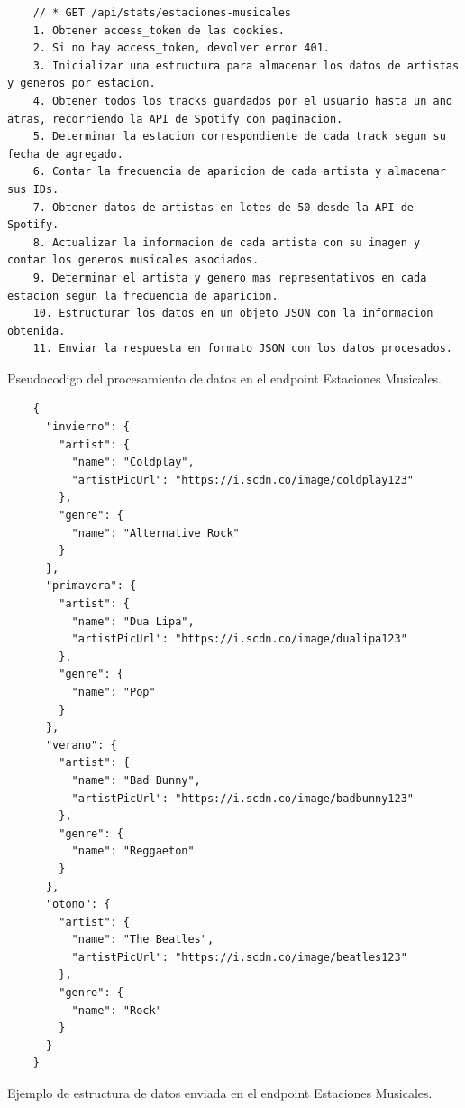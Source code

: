 \begin{ifalgorithm}[H]
  \begin{lstlisting}
    // * GET /api/stats/estaciones-musicales
    1. Obtener access_token de las cookies.
    2. Si no hay access_token, devolver error 401.
    3. Inicializar una estructura para almacenar los datos de artistas y generos por estacion.
    4. Obtener todos los tracks guardados por el usuario hasta un ano atras, recorriendo la API de Spotify con paginacion.
    5. Determinar la estacion correspondiente de cada track segun su fecha de agregado.
    6. Contar la frecuencia de aparicion de cada artista y almacenar sus IDs.
    7. Obtener datos de artistas en lotes de 50 desde la API de Spotify.
    8. Actualizar la informacion de cada artista con su imagen y contar los generos musicales asociados.
    9. Determinar el artista y genero mas representativos en cada estacion segun la frecuencia de aparicion.
    10. Estructurar los datos en un objeto JSON con la informacion obtenida.
    11. Enviar la respuesta en formato JSON con los datos procesados.
    \end{lstlisting}
  \caption{Pseudocodigo del procesamiento de datos en el endpoint Estaciones Musicales.}
  \label{alg:estaciones_musicales}
\end{ifalgorithm}

\begin{ifalgorithm}[H]
  \begin{lstlisting}
    {
      "invierno": {
        "artist": {
          "name": "Coldplay",
          "artistPicUrl": "https://i.scdn.co/image/coldplay123"
        },
        "genre": {
          "name": "Alternative Rock"
        }
      },
      "primavera": {
        "artist": {
          "name": "Dua Lipa",
          "artistPicUrl": "https://i.scdn.co/image/dualipa123"
        },
        "genre": {
          "name": "Pop"
        }
      },
      "verano": {
        "artist": {
          "name": "Bad Bunny",
          "artistPicUrl": "https://i.scdn.co/image/badbunny123"
        },
        "genre": {
          "name": "Reggaeton"
        }
      },
      "otono": {
        "artist": {
          "name": "The Beatles",
          "artistPicUrl": "https://i.scdn.co/image/beatles123"
        },
        "genre": {
          "name": "Rock"
        }
      }
    }
    \end{lstlisting}
  \caption{Ejemplo de estructura de datos enviada en el endpoint Estaciones Musicales.}
  \label{alg:estaciones_musicales_response}
\end{ifalgorithm}

